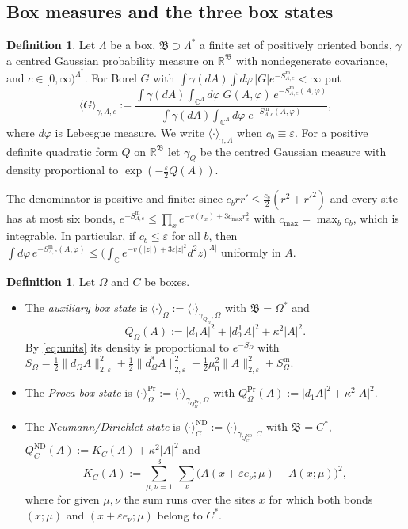 \documentclass[11pt]{amsart}
\theoremstyle{plain}
\theoremstyle{definition}
\newtheorem{definition}[theorem]{Definition}
\theoremstyle{remark}
\numberwithin{equation}{section}
\newcommand{\R}{\mathbb{R}}
\newcommand{\C}{\mathbb{C}}
\newcommand{\eps}{\varepsilon}
\newcommand{\fB}{\mathfrak{B}}
\newcommand{\abs}[1]{\lvert #1\rvert}
\newcommand{\norm}[1]{\lVert #1\rVert}
\newcommand{\ev}[1]{\langle #1\rangle}
\begin{document}
\subsection{Box measures and the three box states}
\begin{definition}\label{def:boxmeasure}
Let $\Lambda$ be a box, $\fB\supset\Lambda^*$ a finite set of positively oriented bonds, $\gamma$ a centred Gaussian probability measure on $\R^\fB$ with nondegenerate covariance, and $c\in[0,\infty)^{\Lambda^*}$. For Borel $G$ with $\int\gamma(dA)\int d\varphi\,\abs{G}e^{-S^{\mathrm m}_{\Lambda,c}}<\infty$ put
\[
\ev{G}_{\gamma,\Lambda,c}:=\frac{\int\gamma(dA)\int_{\C^\Lambda}d\varphi\;G(A,\varphi)\,e^{-S^{\mathrm m}_{\Lambda,c}(A,\varphi)}}{\int\gamma(dA)\int_{\C^\Lambda}d\varphi\;e^{-S^{\mathrm m}_{\Lambda,c}(A,\varphi)}},
\]
where $d\varphi$ is Lebesgue measure. We write $\ev\cdot_{\gamma,\Lambda}$ when $c_b\equiv\eps$. For a positive definite quadratic form $Q$ on $\R^\fB$ let $\gamma_Q$ be the centred Gaussian measure with density proportional to $\exp(-\frac\eps2Q(A))$.
\end{definition}

The denominator is positive and finite: since $c_brr'\le\frac{c_b}2(r^2+r'^2)$ and every site has at most six bonds, $e^{-S^{\mathrm m}_{\Lambda,c}}\le\prod_xe^{-v(r_x)+3c_{\max}r_x^2}$ with $c_{\max}=\max_bc_b$, which is integrable. In particular, if $c_b\le\eps$ for all $b$, then $\int d\varphi\,e^{-S^{\mathrm m}_{\Lambda,c}(A,\varphi)}\le\big(\int_\C e^{-v(\abs z)+3\eps\abs z^2}d^2z\big)^{\abs\Lambda}$ uniformly in $A$.

\begin{definition}\label{def:states}
Let $\Omega$ and $C$ be boxes.
\begin{itemize}
\item[(a)] The \emph{auxiliary box state} is $\ev\cdot_\Omega:=\ev\cdot_{\gamma_{Q_\Omega},\Omega}$ with $\fB=\Omega^*$ and
\[
Q_\Omega(A):=\abs{d_1A}^2+\abs{d_0^{\mathsf T}A}^2+\kappa^2\abs A^2 .
\]
By \eqref{eq:units} its density is proportional to $e^{-S_\Omega}$ with $S_\Omega=\frac12\norm{d_\Omega A}_{2,\eps}^2+\frac12\norm{d_\Omega^*A}_{2,\eps}^2+\frac12\mu_0^2\norm A_{2,\eps}^2+S^{\mathrm m}_\Omega$.
\item[(b)] The \emph{Proca box state} is $\ev\cdot_\Omega^{\mathrm{Pr}}:=\ev\cdot_{\gamma_{Q^{\mathrm{Pr}}_\Omega},\Omega}$ with $Q^{\mathrm{Pr}}_\Omega(A):=\abs{d_1A}^2+\kappa^2\abs A^2$.
\item[(c)] The \emph{Neumann/Dirichlet state} is $\ev\cdot^{\mathrm{ND}}_C:=\ev\cdot_{\gamma_{Q^{\mathrm{ND}}_C},C}$ with $\fB=C^*$, $Q^{\mathrm{ND}}_C(A):=K_C(A)+\kappa^2\abs A^2$ and
\[
K_C(A):=\sum_{\mu,\nu=1}^3\ \sum_{x}\big(A(x+\eps e_\nu;\mu)-A(x;\mu)\big)^2 ,
\]
where for given $\mu,\nu$ the sum runs over the sites $x$ for which both bonds $(x;\mu)$ and $(x+\eps e_\nu;\mu)$ belong to $C^*$.
\end{itemize}
\end{definition}
\end{document}
